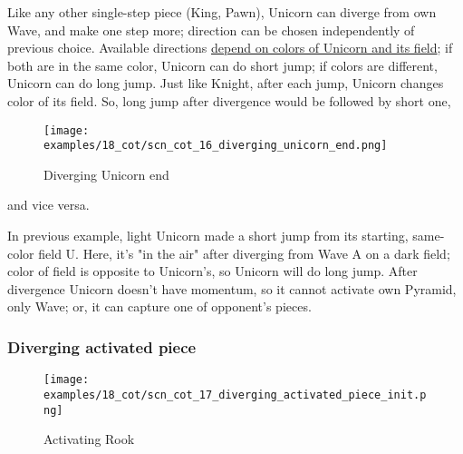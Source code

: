 \vspace*{-0.5\baselineskip}
Like any other single-step piece (King, Pawn), Unicorn can diverge from own Wave,
and make one step more; direction can be chosen independently of previous choice.
Available directions
\hyperref[fig:scn_aoa_01_unicorn_same_color]{depend on colors of Unicorn and its field};
if both are in the same color, Unicorn can do short jump; if colors are different, Unicorn
can do long jump. Just like Knight, after each jump, Unicorn changes color of its field.
So, long jump after divergence would be followed by short one,

\clearpage %

\vspace*{-2.1\baselineskip}
\noindent
\begin{figure}[!h]
\texttt{[image: examples/18\_cot/scn\_cot\_16\_diverging\_unicorn\_end.png]}
\vspace*{-1.3\baselineskip}
\caption{Diverging Unicorn end}
\label{fig:scn_cot_16_diverging_unicorn_end}
\end{figure}

\vspace*{-0.4\baselineskip}
\noindent
and vice versa.

In previous example, light Unicorn made a short jump from its starting, same-color
field U. Here, it's "in the air" after diverging from Wave A on a dark field; color
of field is opposite to Unicorn's, so Unicorn will do long jump.
After divergence Unicorn doesn't have momentum, so it cannot activate own Pyramid,
only Wave; or, it can capture one of opponent's pieces.

\clearpage %

\subsubsection*{Diverging activated piece}
\label{sec:Conquest of Tlalocan/Shaman/Divergence/Diverging activated piece}

\vspace*{-1.4\baselineskip}
\noindent
\begin{figure}[!h]
\texttt{[image: examples/18\_cot/scn\_cot\_17\_diverging\_activated\_piece\_init.png]}
\vspace*{-1.3\baselineskip}
\caption{Activating Rook}
\label{fig:scn_cot_17_diverging_activated_piece_init}
\end{figure}

